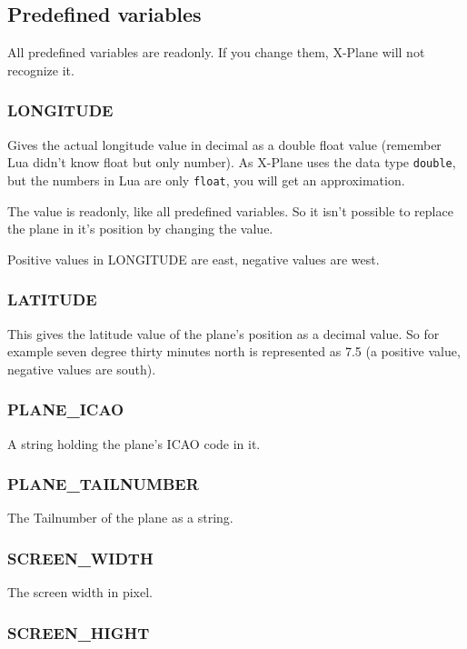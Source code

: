 \documentclass[11pt,parskip=half,a4paper]{scrartcl}
\begin{document}
\subsection{Predefined variables}

All predefined variables are readonly. If you change them, X-Plane will not recognize it.

\subsubsection{LONGITUDE}

Gives the actual longitude value in decimal as a double float value (remember Lua didn't know float but only number). As X-Plane uses the data type \verb|double|, but the numbers in Lua are only \verb|float|, you will get an approximation.

The value is readonly, like all predefined variables. So it isn't possible to replace the plane in it's position by changing the value.

Positive values in LONGITUDE are east, negative values are west.

\subsubsection{LATITUDE}

This gives the latitude value of the plane's position as a decimal value. So for example seven degree thirty minutes north is represented as 7.5 (a positive value, negative values are south).

\subsubsection{PLANE\_ICAO}

A string holding the plane's ICAO code in it.

\subsubsection{PLANE\_TAILNUMBER}

The Tailnumber of the plane as a string.

\subsubsection{SCREEN\_WIDTH}

The screen width in pixel.

\subsubsection{SCREEN\_HIGHT}
\end{document}
